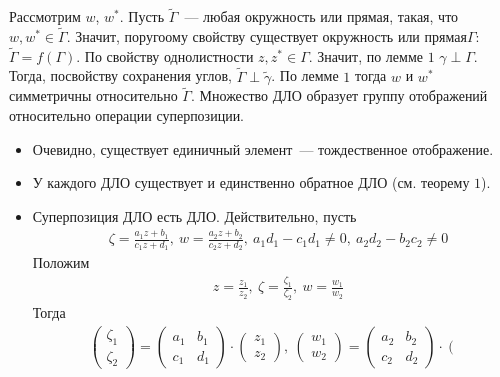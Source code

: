 Рассмотрим $w$, $w^*$. Пусть $\tilde{\Gamma}$~--- любая окружность или прямая,
такая, что $w, w^* \in \tilde{\Gamma}$. Значит, поругоому свойству существует
окружность или прямая$\Gamma$: $\tilde{\Gamma} = f(\Gamma)$. По свойству
однолистности $z, z^* \in \Gamma$. Значит, по лемме $1$ $\gamma \perp \Gamma$.
Тогда, посвойству сохранения углов, $\tilde{\Gamma} \perp \tilde{\gamma}$. По
лемме $1$ тогда $w$ и $w^*$ симметричны относительно $\tilde{\Gamma}$.
\theorem
Множество ДЛО образует группу отображений относительно операции суперпозиции.
\pr
~
\begin{itemize}
    \item Очевидно, существует единичный элемент~--- тождественное отображение.
    \item У каждого ДЛО существует и единственно обратное ДЛО (см. теорему $1$).
    \item Суперпозиция ДЛО есть ДЛО. Действительно, пусть
    \begin{align*}
      & \zeta = \frac{a_1z+b_1}{c_1z+d_1}, \ w = \frac{a_2z+b_2}{c_2z+d_2}, \ a_1d_1 - c_1d_1 \neq 0, \ a_2d_2 - b_2c_2 \neq 0
    \end{align*}
    Положим
    \begin{align*}
      & z = \frac{z_1}{z_2}, \ \zeta = \frac{\zeta_1}{\zeta_2}, \ w = \frac{w_1}{w_2}
    \end{align*}
    Тогда
    \begin{align*}
      & \left( \begin{matrix}
              \zeta_1 \\
              \zeta_2
          \end{matrix} \right) = \left( \begin{matrix}
              a_1 & b_1 \\
              c_1 & d_1
          \end{matrix} \right) \cdot \left( \begin{matrix}
              z_1 \\
              z_2
          \end{matrix} \right), \ \left( \begin{matrix}
              w_1 \\
              w_2
          \end{matrix} \right) = \left( \begin{matrix}
              a_2 & b_2 \\
              c_2 & d_2
          \end{matrix} \right) \cdot \left( \begin{matrix}

\end{matrix}
\end{align*}
\end{itemize}

